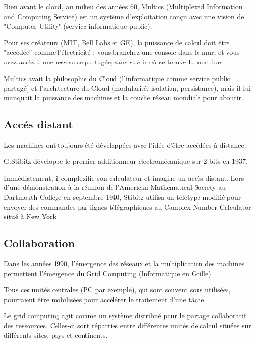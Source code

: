 \documentclass{rapportClass} %
\begin{document}
Bien avant le cloud, au milieu des années 60, Multics (Multiplexed
Information and Computing Service) est un système d'exploitation conçu
avec une vision de "Computer Utility" (service informatique public).

Pour ses créateurs (MIT, Bell Labs et GE), la puissance de calcul doit
être "accédée'' comme l'électricité : vous branchez une console dans
le mur, et vous avez accès à une ressource partagée, sans savoir où se
trouve la machine.

Multics avait la philosophie du Cloud (l'informatique comme service
public partagé) et l'architecture du Cloud (modularité, isolation,
persistance), mais il lui manquait la puissance des machines et la
couche réseau mondiale pour aboutir.

\subsection{Accés distant}
Les machines ont toujours été développées avec l'idée d'être accédées à distance.

G.Stibitz développe le premier additionneur electromécanique
sur 2 bits en 1937. \cite{WikipediaAdder2026}


Immédiatement, il complexifie son calculateur et imagine un accès
distant. Lors d'une démonstration à la réunion de l'American
Mathematical Society au Dartmouth College en septembre 1940, Stibitz
utilisa un télétype modifié pour envoyer des commandes par lignes
télégraphiques au Complex Number Calculator situé à New York. \cite{Stibitz2012}


\subsection{Collaboration}
Dans les années 1990, l'émergence des réseaux et la multiplication des
machines permettent l'émergence du Grid Computing (Informatique en Grille).

Tous ces unités centrales (PC par exemple), qui sont souvent sous
utilisées, pourraient être mobilisées pour accélérer le traitement d'une
tâche.

Le grid computing agit comme un système distribué pour le partage
collaboratif des ressources.  Celles-ci sont réparties entre
différentes unités de calcul situées sur différents sites, pays et
continents.
\end{document}
